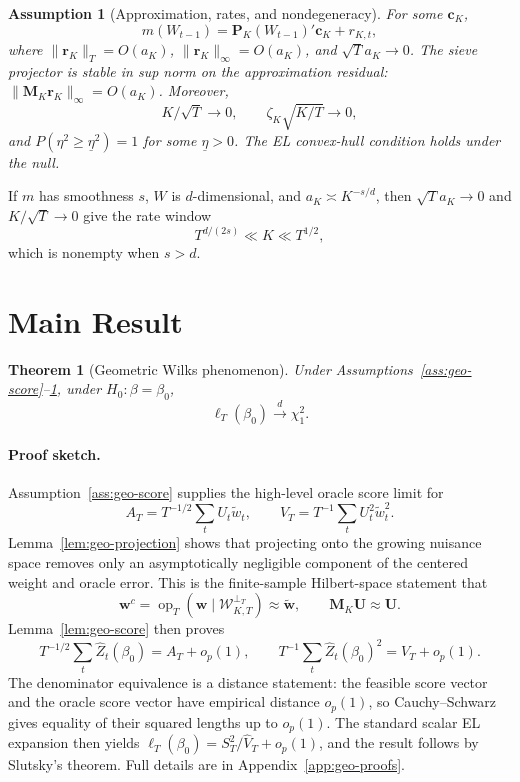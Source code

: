 ﻿\documentclass[11pt]{article}
\newtheorem{theorem}{Theorem}
\newtheorem{assumption}{Assumption}
\begin{document}
\begin{assumption}[Approximation, rates, and nondegeneracy]
\label{ass:geo-approx}
For some \(\bm c_K\),
\[
    m(W_{t-1})=\bm P_K(W_{t-1})'\bm c_K+r_{K,t},
\]
where \(\|\bm r_K\|_T=O(a_K)\), \(\|\bm r_K\|_\infty=O(a_K)\), and \(\sqrt T a_K\to0\). The sieve projector is stable in sup norm on the approximation residual: \(\|\bm M_K\bm r_K\|_\infty=O(a_K)\). Moreover,
\[
    K/\sqrt T\to0,
    \qquad
    \zeta_K\sqrt{K/T}\to0,
\]
and \(P(\eta^2\geq\underline\eta^2)=1\) for some \(\underline\eta>0\). The EL convex-hull condition holds under the null.
\end{assumption}

If \(m\) has smoothness \(s\), \(W\) is \(d\)-dimensional, and \(a_K\asymp K^{-s/d}\), then \(\sqrt T a_K\to0\) and \(K/\sqrt T\to0\) give the rate window
\begin{equation}
    T^{d/(2s)}\ll K\ll T^{1/2},
    \label{eq:geo-rate-window}
\end{equation}
which is nonempty when \(s>d\).

\section{Main Result}

\begin{theorem}[Geometric Wilks phenomenon]
\label{thm:geo-wilks}
Under Assumptions~\ref{ass:geo-score}--\ref{ass:geo-approx}, under \(H_0:\beta=\beta_0\),
\[
    \ell_T(\beta_0)\xrightarrow{d}\chi_1^2.
\]
\end{theorem}

\paragraph{Proof sketch.}
Assumption~\ref{ass:geo-score} supplies the high-level oracle score limit for
\[
    A_T=T^{-1/2}\sum_tU_t\widetilde w_t,
    \qquad
    V_T=T^{-1}\sum_tU_t^2\widetilde w_t^2.
\]
Lemma~\ref{lem:geo-projection} shows that projecting onto the growing nuisance space removes only an asymptotically negligible component of the centered weight and oracle error. This is the finite-sample Hilbert-space statement that
\[
    \bm w^c=\operatorname{op}_T(\bm w\mid\mathcal W_{K,T}^{\perp_T})
    \approx \widetilde{\bm w},
    \qquad
    \bm M_K\bm U\approx \bm U.
\]
Lemma~\ref{lem:geo-score} then proves
\[
    T^{-1/2}\sum_t\widehat Z_t(\beta_0)=A_T+o_p(1),
    \qquad
    T^{-1}\sum_t\widehat Z_t(\beta_0)^2=V_T+o_p(1).
\]
The denominator equivalence is a distance statement: the feasible score vector and the oracle score vector have empirical distance \(o_p(1)\), so Cauchy--Schwarz gives equality of their squared lengths up to \(o_p(1)\). The standard scalar EL expansion then yields \(\ell_T(\beta_0)=S_T^2/\widehat V_T+o_p(1)\), and the result follows by Slutsky's theorem. Full details are in Appendix~\ref{app:geo-proofs}.
\end{document}
